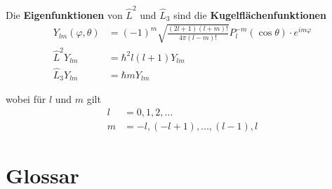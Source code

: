 \documentclass{article}
\begin{document}
Die \textbf{Eigenfunktionen} von $\hat{L}^2$ und $\hat{L}_3$ sind die \textbf{Kugelflächenfunktionen}
	\begin{align}
		Y_{lm}(\varphi, \theta) &= (-1)^m \sqrt{\frac{(2l + 1)(l + m)!}{4\pi (l-m)!}} P_l^{-m}(\cos\theta) \cdot e^{im\varphi}\\
		\hat{L}^2 Y_{lm} &= \hbar^2 l(l+1) Y_{lm}\\
		\hat{L}_3 Y_{lm} &= \hbar m Y_{lm}
	\end{align}

wobei für $l$ und $m$ gilt
	\begin{align}
		l &= 0, 1, 2, ...\\
		m &= -l, (-l+1), ..., (l-1), l
	\end{align}


\newpage


\section{Glossar}
\end{document}

